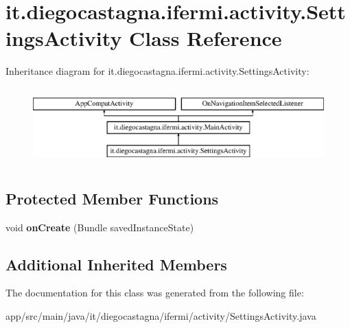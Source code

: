 \hypertarget{classit_1_1diegocastagna_1_1ifermi_1_1activity_1_1_settings_activity}{}\section{it.\+diegocastagna.\+ifermi.\+activity.\+Settings\+Activity Class Reference}
\label{classit_1_1diegocastagna_1_1ifermi_1_1activity_1_1_settings_activity}
Inheritance diagram for it.\+diegocastagna.\+ifermi.\+activity.\+Settings\+Activity\+:\begin{figure}[H]
\begin{center}
\leavevmode
\includegraphics[height=2.989324cm]{classit_1_1diegocastagna_1_1ifermi_1_1activity_1_1_settings_activity}
\end{center}
\end{figure}
\subsection*{Protected Member Functions}
\begin{DoxyCompactItemize}
\item 
\mbox{\label{classit_1_1diegocastagna_1_1ifermi_1_1activity_1_1_settings_activity_a2d79918cc85073a850c140c8e75bd868}} 
void {\bfseries on\+Create} (Bundle saved\+Instance\+State)
\end{DoxyCompactItemize}
\subsection*{Additional Inherited Members}


The documentation for this class was generated from the following file\+:\begin{DoxyCompactItemize}
\item 
app/src/main/java/it/diegocastagna/ifermi/activity/Settings\+Activity.\+java\end{DoxyCompactItemize}
